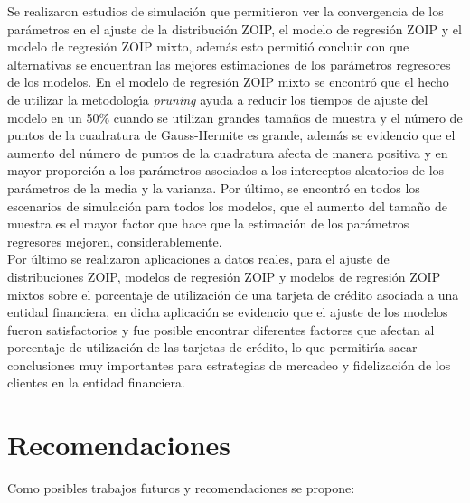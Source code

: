 Se realizaron estudios de simulaci\'{o}n que permitieron ver la convergencia de los par\'{a}metros en el ajuste de la distribuci\'{o}n ZOIP, el modelo de regresi\'{o}n ZOIP y el modelo de regresi\'{o}n ZOIP mixto, adem\'{a}s esto permiti\'{o} concluir con que alternativas se encuentran las mejores estimaciones de los par\'{a}metros regresores de los modelos. En el modelo de regresi\'{o}n ZOIP mixto se encontr\'{o} que el hecho de utilizar la metodolog\'{\i}a \textit{pruning} ayuda a reducir los tiempos de ajuste del modelo en un 50\% cuando se utilizan grandes tama\~{n}os de muestra y el n\'{u}mero de puntos de la cuadratura de Gauss-Hermite es grande, adem\'{a}s se evidencio que el aumento del n\'{u}mero de puntos de la cuadratura afecta de manera positiva y en mayor proporci\'{o}n a los par\'{a}metros asociados a los interceptos aleatorios de los par\'{a}metros de la media y la varianza. Por \'{u}ltimo, se encontr\'{o} en todos los escenarios de simulaci\'{o}n para todos los modelos, que el aumento del tama\~{n}o de muestra es el mayor factor que hace que la estimaci\'{o}n de los par\'{a}metros regresores mejoren, considerablemente.\\

Por \'{u}ltimo se realizaron aplicaciones a datos reales, para el ajuste de distribuciones ZOIP, modelos de regresi\'{o}n ZOIP y modelos de regresi\'{o}n ZOIP mixtos sobre el porcentaje de utilizaci\'{o}n de una tarjeta de cr\'{e}dito asociada a una entidad financiera, en dicha aplicaci\'{o}n se evidencio que el ajuste de los modelos fueron satisfactorios y  fue posible encontrar diferentes factores que afectan al porcentaje de utilizaci\'{o}n de las tarjetas de cr\'{e}dito, lo que permitir\'{\i}a sacar conclusiones muy importantes para estrategias de mercadeo y fidelizaci\'{o}n de los clientes en la entidad financiera.


\section{Recomendaciones}

Como posibles trabajos futuros y recomendaciones se propone:

